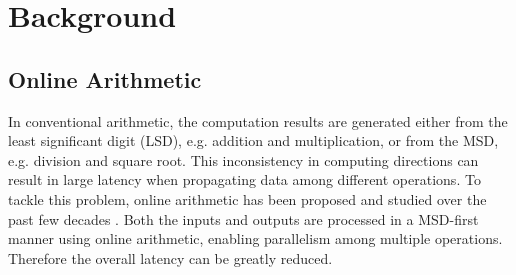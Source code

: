 \documentclass{acm_proc_article-sp}
\begin{document}








\section{Background}
\subsection{Online Arithmetic}
In conventional arithmetic, the computation results are generated either from the least significant digit (LSD), e.g. addition and multiplication, or from the MSD, e.g. division and square root. This inconsistency in computing directions can result in large latency when propagating data among different operations. To tackle this problem, online arithmetic has been proposed and studied over the past few decades \cite{Ercegovac_OnlineOverview,Ercegovac_OnlineMult,Online_Trunc}. Both the inputs and outputs are processed in a MSD-first manner using online arithmetic, enabling parallelism among multiple operations. Therefore the overall latency can be greatly reduced.
\vspace{-1ex}
\end{document}
